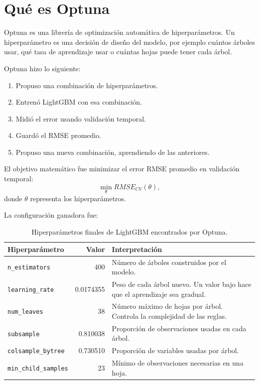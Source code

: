 \documentclass[12pt,letterpaper]{article}
\begin{document}
\section{Qué es Optuna}
Optuna es una librería de optimización automática de hiperparámetros. Un hiperparámetro es una decisión de diseño del modelo, por ejemplo cuántos árboles usar, qué tasa de aprendizaje usar o cuántas hojas puede tener cada árbol.

Optuna hizo lo siguiente:
\begin{enumerate}
    \item Propuso una combinación de hiperparámetros.
    \item Entrenó LightGBM con esa combinación.
    \item Midió el error usando validación temporal.
    \item Guardó el RMSE promedio.
    \item Propuso una nueva combinación, aprendiendo de las anteriores.
\end{enumerate}

El objetivo matemático fue minimizar el error RMSE promedio en validación temporal:
\begin{equation}
\min_{\theta} RMSE_{CV}(\theta),
\end{equation}
donde $\theta$ representa los hiperparámetros.

La configuración ganadora fue:
\begin{table}[H]
\centering
\caption{Hiperparámetros finales de LightGBM encontrados por Optuna.}
\begin{tabular}{lrp{7.5cm}}
\toprule
Hiperparámetro & Valor & Interpretación \\
\midrule
\texttt{n\_estimators} & 400 & Número de árboles construidos por el modelo. \\
\texttt{learning\_rate} & 0.0174355 & Peso de cada árbol nuevo. Un valor bajo hace que el aprendizaje sea gradual. \\
\texttt{num\_leaves} & 38 & Número máximo de hojas por árbol. Controla la complejidad de las reglas. \\
\texttt{subsample} & 0.810038 & Proporción de observaciones usadas en cada árbol. \\
\texttt{colsample\_bytree} & 0.730510 & Proporción de variables usadas por árbol. \\
\texttt{min\_child\_samples} & 23 & Mínimo de observaciones necesarias en una hoja. \\
\bottomrule
\end{tabular}
\end{table}
\end{document}
